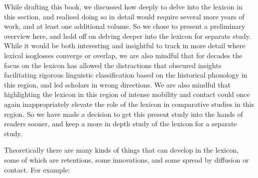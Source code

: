 While drafting this book,
we discussed how deeply to delve into the lexicon in this section,
and realised doing so in detail would require several more years
of work, and at least one additional volume.
So we chose to present a preliminary overview here,
and hold off on delving deeper into the lexicon for separate study.
While it would be both interesting
and insightful to track in more detail where lexical isoglosses
converge or overlap, we are also mindful that for decades the focus on the lexicon
has allowed the distractions that obscured insights facilitating
rigorous linguistic classification based on the historical phonology
in this region, and led scholars in wrong directions.
We are also mindful that highlighting the lexicon in this region
of intense mobility and contact could once again inappropriately elevate the role
of the lexicon in comparative studies in this region.
So we have made a decision to get this present study into the
hands of readers sooner,
and keep a more in depth study of the lexicon for a separate study.

Theoretically there are many kinds of things that can develop
in the lexicon, some of which are retentions,
some innovations, and some spread by diffusion or contact.
For example: 

